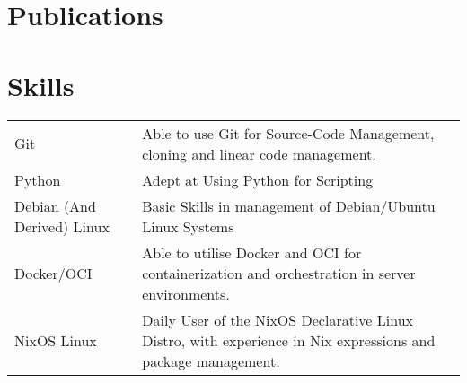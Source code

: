 \documentclass[a4paper,12pt]{article}
\begin{document}
\section{Publications}
\begin{refsection}
\nocite{sfm2024}
\printbibliography[heading=none]
\end{refsection}

\section{Skills}
\begin{tabularx}{\linewidth}{@{}l X@{}}
Git &  \normalsize{Able to use Git for Source-Code Management, cloning and linear code management.}\\
Python  &  \normalsize{Adept at Using Python for Scripting}\\ 
Debian (And Derived) Linux  &  \normalsize{Basic Skills in management of Debian/Ubuntu Linux Systems}\\ 
Docker/OCI  &  \normalsize{Able to utilise Docker and OCI for containerization and orchestration in server environments.}\\ 
NixOS Linux  &  \normalsize{Daily User of the NixOS Declarative Linux Distro, with experience in Nix expressions and package management.}\\ 

\end{tabularx}

\vfill
{}
\end{document}
